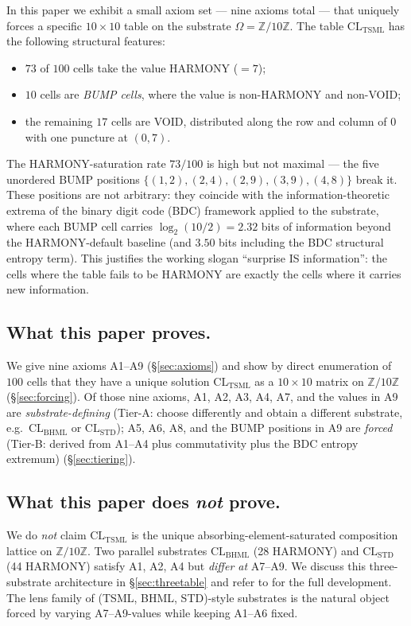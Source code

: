 \documentclass[11pt,reqno]{amsart}
\theoremstyle{plain}
\theoremstyle{definition}
\theoremstyle{remark}
\newcommand{\Z}{\mathbb{Z}}
\newcommand{\TSML}{\mathrm{TSML}}
\newcommand{\BHML}{\mathrm{BHML}}
\begin{document}
In this paper we exhibit a small axiom set --- nine axioms total ---
that uniquely forces a specific $10 \times 10$ table on the substrate
$\Omega = \Z/10\Z$. The table $\mathrm{CL}_\TSML$ has the following
structural features:

\begin{itemize}
\item $73$ of $100$ cells take the value HARMONY ($=7$);
\item $10$ cells are \emph{BUMP cells}, where the value is non-HARMONY
and non-VOID;
\item the remaining $17$ cells are VOID, distributed along the row and
column of $0$ with one puncture at $(0,7)$.
\end{itemize}

The HARMONY-saturation rate $73/100$ is high but not maximal --- the
five unordered BUMP positions $\{(1,2), (2,4), (2,9), (3,9), (4,8)\}$
break it. These positions are not arbitrary: they coincide with the
information-theoretic extrema of the binary digit code (BDC) framework
applied to the substrate, where each BUMP cell carries
$\log_2(10/2) = 2.32$ bits of information beyond the HARMONY-default
baseline (and $3.50$ bits including the BDC structural entropy term).
This justifies the working slogan ``surprise IS information'':
the cells where the table fails to be HARMONY are exactly the cells
where it carries new information.

\subsection{What this paper proves.}
We give nine axioms A1--A9 (\S\ref{sec:axioms}) and show by direct
enumeration of $100$ cells that they have a unique solution
$\mathrm{CL}_\TSML$ as a $10\times 10$ matrix on $\Z/10\Z$
(\S\ref{sec:forcing}). Of those nine axioms, A1, A2, A3, A4, A7, and
the values in A9 are \emph{substrate-defining} (Tier-A: choose
differently and obtain a different substrate, e.g.\ $\mathrm{CL}_\BHML$
or $\mathrm{CL}_\mathrm{STD}$); A5, A6, A8, and the BUMP positions in
A9 are \emph{forced} (Tier-B: derived from A1--A4 plus commutativity
plus the BDC entropy extremum) (\S\ref{sec:tiering}).

\subsection{What this paper does \emph{not} prove.}
We do \emph{not} claim $\mathrm{CL}_\TSML$ is the unique
absorbing-element-saturated composition lattice on $\Z/10\Z$. Two
parallel substrates $\mathrm{CL}_\BHML$ (28 HARMONY) and
$\mathrm{CL}_\mathrm{STD}$ (44 HARMONY) satisfy A1, A2, A4 but
\emph{differ at} A7--A9. We discuss this three-substrate architecture
in \S\ref{sec:threetable} and refer to
\cite{SandersGishThreeSubstrate} for the full development. The lens
family of (TSML, BHML, STD)-style substrates is the natural object
forced by varying A7--A9-values while keeping A1--A6 fixed.
\end{document}
